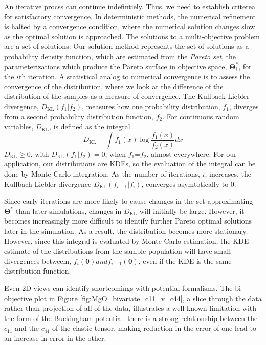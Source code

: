 An iterative procss can continue indefintiely. Thus, we need to establish criterea for satisfactory convergence. In deterministic methods, the numerical refinement is halted by a convergence condition, where the numerical solution changes slow as the optimal solution is approached.  The solutions to a multi-objective problem are a set of solutions.  Our solution method represents the set of solutions as a probability density function, which are estimated from the \emph{Pareto set}, the parameterizations which produce the Pareto surface in objective space, $\bm{\Theta}_i^*$, for the $i$th iteration.  A statistical analog to numerical convergence is to assess the convergence of the distribution, where we look at the difference of the distribution of the samples as a measure of convergence. The Kullback-Liebler\cite{kullback1951_kld} divergence, $D_{\text{KL}}(f_1 \vert f_2)$, measures how one probability distribution, $f_1$, diverges from a second probability distribution function, $f_2$.  For continuous random variables, $D_{\text{KL}}$, is defined as the integral
\begin{equation}\label{eq:kld}
    D_{\text{KL}} - \int f_1(x) \log \frac{f_1(x)}{f_2(x)} dx
\end{equation}
$D_{\text{KL}} \geq 0$, with $D_{\text{KL}} (f_1 \vert f_2 )=0$, when $f_1$=$f_2$, almost everywhere.  For our application, our distributions are KDEs, so the evaluation of the integral can be done by Monte Carlo integration\cite{hershey_kld_mc_integration}.  As the number of iterations, $i$, increases, the Kullbach-Liebler divergence $D_{\text{KL}}(f_{i-1}\vert f_i )$, converges asymtotically to $0$.

Since early iterations are more likely to cause changes in the set approximating $\bm{\Theta}^*$ than later simulations, changes in $D_{\text{KL}}$ will initially be large.  However, it becomes increasingly more difficult to identify further Pareto optimal solutions later in the simulation.  As a result, the distribution becomes more stationary.  However, since this integral is evaluated by Monte Carlo estimation, the KDE estimate of the distributions from the sample population will have small divergences betweem, $f_i(\bm{\theta}) and f_{i-1}(\bm{\theta})$, even if the KDE is the same distribution function.

Even 2D views can identify shortcomings with potential formalisms.  The bi-objective plot in Figure \ref{fig:MgO_bivariate_c11_v_c44}, a slice through the data rather than projection of all of the data, illustrates a well-known limitation with the form of the Buckingham potential: there is a strong relationship between the $c_{11}$ and the $c_{44}$ of the elastic tensor, making reduction in the error of one lead to an increase in error in the other.

